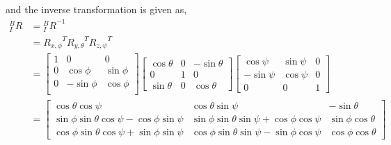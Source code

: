 and the inverse transformation is given as,\\
\begin{equation}
\begin{aligned}
{^B _I}R
& = {{^B _I}R}^{-1}\\
& = {R_{x, \phi}}^{T}  {R_{y, \theta}}^{T} {R_{z, \psi}}^{T}\\
&=
\begin{bmatrix}
1 & 0 & 0\\
0& \cos{\phi} & \sin{\phi} \\
0 & - \sin{\phi} & \cos{\phi} \\
\end{bmatrix}
\begin{bmatrix}
\cos{\theta} & 0& - \sin{\theta} \\
0 & 1 & 0 \\
\sin{\theta} & 0 & \cos{\theta}
\end{bmatrix}
\begin{bmatrix}
\cos{\psi} & \sin{\psi} & 0 \\
-\sin{\psi} & \cos{\psi} & 0\\
0 & 0 & 1
\end{bmatrix}\\
& =
\begin{bmatrix}
  \cos{\theta} \cos{\psi}  &  \cos{\theta} \sin{\psi} & - \sin{\theta}  \\
\sin{\phi} \sin{\theta} \cos{\psi} - \cos{\phi} \sin{\psi} & \sin{\phi} \sin{\theta} \sin{\psi} + \cos{\phi} \cos{\psi} & \sin{\phi} \cos{\theta} \\
\cos{\phi} \sin{\theta} \cos{\psi}  +  \sin{\phi} \sin{\psi} & \cos{\phi} \sin{\theta} \sin{\psi}- \sin{\phi} \cos{\psi} & \cos{\phi}\cos{\theta}
\end{bmatrix}\\
\end{aligned}
\end{equation}





